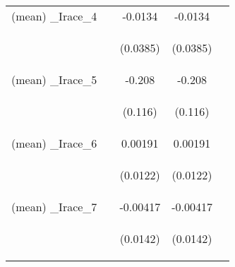 \documentclass[]{article}
\begin{document}
\begin{center}
\begin{tabular}{lcccc}
(mean) \_Irace\_4 &  & -0.0134 & -0.0134 &  \\
\vspace{4pt} & \begin{footnotesize}\end{footnotesize} & \begin{footnotesize}(0.0385)\end{footnotesize} & \begin{footnotesize}(0.0385)\end{footnotesize} & \begin{footnotesize}\end{footnotesize} \\
(mean) \_Irace\_5 &  & -0.208 & -0.208 &  \\
\vspace{4pt} & \begin{footnotesize}\end{footnotesize} & \begin{footnotesize}(0.116)\end{footnotesize} & \begin{footnotesize}(0.116)\end{footnotesize} & \begin{footnotesize}\end{footnotesize} \\
(mean) \_Irace\_6 &  & 0.00191 & 0.00191 &  \\
\vspace{4pt} & \begin{footnotesize}\end{footnotesize} & \begin{footnotesize}(0.0122)\end{footnotesize} & \begin{footnotesize}(0.0122)\end{footnotesize} & \begin{footnotesize}\end{footnotesize} \\
(mean) \_Irace\_7 &  & -0.00417 & -0.00417 &  \\
\vspace{4pt} & \begin{footnotesize}\end{footnotesize} & \begin{footnotesize}(0.0142)\end{footnotesize} & \begin{footnotesize}(0.0142)\end{footnotesize} & \begin{footnotesize}\end{footnotesize} \\

\end{tabular}
\end{center}
\end{document}
